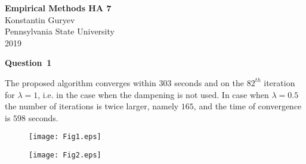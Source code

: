 \documentclass[a4paper,12pt]{article}
\begin{document}
\maketitle \hrulefill
{}

\begin{center}

\textbf {\Large{Empirical Methods HA 7}}\\
Konstantin Guryev\\
Pennsylvania State University\\
2019
\end{center}



\textbf{Question \textnumero \,1 }

\vspace{\baselineskip}
The proposed algorithm converges within $303$ seconds and on the $82^{th}$ iteration for $\lambda = 1$, i.e. in the case when the dampening is not used. In case when $\lambda = 0.5$ the number of iterations is twice larger, namely $165$, and the time of convergence is $598$ seconds.

\begin{figure}[h]
\centering
\texttt{[image: Fig1.eps]}
\end{figure}
\vspace{\baselineskip}

\begin{figure}[h]
\centering
\texttt{[image: Fig2.eps]}
\end{figure}
\vspace{\baselineskip}
\end{document}
